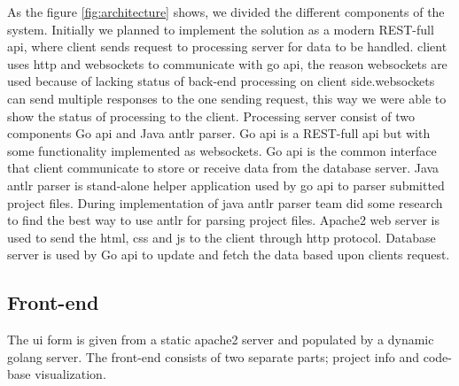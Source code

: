 As the figure \ref{fig:architecture} shows, we divided the different components of the system. Initially we planned to implement the solution as a modern REST-full \gls{api}, where \gls{client} sends request to processing server for data to be handled. \Gls{client} uses \gls{http} and \glspl{websocket} to communicate with go \gls{api}, the reason \glspl{websocket} are used because of lacking status of back-end processing on \gls{client} side.\glspl{websocket} can send multiple responses to the one sending request, this way we were able to show the status of processing to the \gls{client}. Processing server consist of two components Go \gls{api} and Java antlr parser. Go \gls{api} is a REST-full \gls{api} but with some functionality implemented as \glspl{websocket}. Go \gls{api} is the common interface that \gls{client} communicate to store or receive data from the database server. Java \gls{antlr} parser is stand-alone helper application used by go \gls{api} to parser submitted project files. During implementation of java antlr parser team did some research to find the best way to use \gls{antlr} for parsing project files. Apache2 web server is used to send the \gls{html}, \gls{css} and \gls{js} to the \gls{client} through http protocol. Database server is used by Go \gls{api} to update and fetch the data based upon \glspl{client} request.

\subsection{Front-end}



The \gls{ui} form is given from a static \gls{apache2} server and populated by a dynamic \Gls{golang} server. The front-end consists of two separate parts; project info and code-base visualization.

